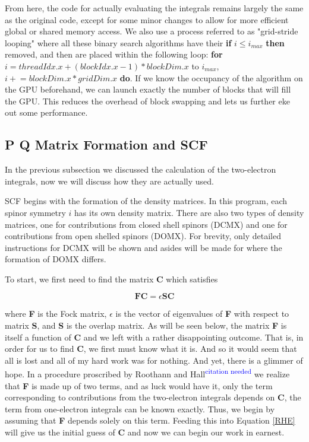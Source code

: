 \documentclass[12pt]{book}
\newcommand{\citethis}{\textsuperscript{\textcolor{blue}{citation needed}}} %
\begin{document}
From here, the code for actually evaluating the integrals remains largely the same as the original code, except for some minor changes to allow for more efficient global or shared memory access. We also use a process referred to as "grid-stride looping" where all these binary search algorithms have their \textbf{if} $i \le i_{max}$ \textbf{then} removed, and then are placed within the following loop: \textbf{for} $i = threadIdx.x + (blockIdx.x - 1) * blockDim.x$ to $i_{max}$, $i \mathrel{+}= blockDim.x * gridDim.x$ \textbf{do}. If we know the occupancy of the algorithm on the GPU beforehand, we can launch exactly the number of blocks that will fill the GPU. This reduces the overhead of block swapping and lets us further eke out some performance.

\subsection{P Q Matrix Formation and SCF}

In the previous subsection we discussed the calculation of the two-electron integrals, now we will discuss how they are actually used. 

SCF begins with the formation of the density matrices. In this program, each spinor symmetry $i$ has its own density matrix. There are also two types of density matrices, one for contributions from closed shell spinors (DCMX) and one for contributions from open shelled spinors (DOMX). For brevity, only detailed instructions for DCMX will be shown and asides will be made for where the formation of DOMX differs.

To start, we first need to find the matrix \textbf{C} which satisfies 

\begin{equation}
\label{RHE}
\textbf{FC} = \epsilon{}\textbf{SC}
\end{equation}

where \textbf{F} is the Fock matrix, $\epsilon$ is the vector of eigenvalues of \textbf{F} with respect to matrix \textbf{S}, and \textbf{S} is the overlap matrix. As will be seen below, the matrix \textbf{F} is itself a function of \textbf{C} and we left with a rather disappointing outcome. That is, in order for us to find \textbf{C}, we first must know what it is. And so it would seem that all is lost and all of my hard work was for nothing. And yet, there is a glimmer of hope. In a procedure proscribed by Roothann and Hall\citethis{} we realize that \textbf{F} is made up of two terms, and as luck would have it, only the term corresponding to contributions from the two-electron integrals depends on \textbf{C}, the term from one-electron integrals can be known exactly. Thus, we begin by assuming that \textbf{F} depends solely on this term. Feeding this into Equation \ref{RHE} will give us the initial guess of \textbf{C} and now we can begin our work in earnest. 
\end{document}
